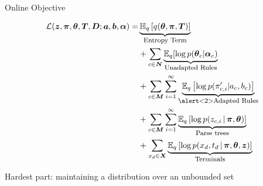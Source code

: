 \begin{frame}{Online Objective}

\begin{align}
\elbo ( \boldsymbol{z}, \boldsymbol{\pi}, \boldsymbol{\theta},
  \boldsymbol{T}, \boldsymbol{D}; \boldsymbol{a}, \boldsymbol{b},
  \boldsymbol{\alpha}) = & \explain{Entropy Term}{\h{q}{ q( \boldsymbol{\theta}, \boldsymbol{\pi}, \boldsymbol{T} ) }} \notag \\
  & +  \sum_{c \in \boldsymbol{N}} \explain{Unadapted Rules}{\mathbb{E}_q [ \log{ p(
    \boldsymbol{\theta}_c | \boldsymbol{\alpha}_c ) } } \notag \\
  &  + \sum_{c \in \boldsymbol{M}} \sum_{i=1}^{\infty}
  \explain{\alert<2>{Adapted Rules}}{\e{q}{ \log{   p ( \pi^{\prime}_{c, i} | a_c, b_c
    ) } }} \notag \\
  &  + \sum_{c \in \boldsymbol{M}} \sum_{i=1}^{\infty}
  \explain{Parse trees}{\e{q}{ \log{ p ( z_{c, i} \g \boldsymbol{\pi},
    \boldsymbol{\theta} ) } } } \notag \\
  &  + \sum_{x_d \in \boldsymbol{X}} \explain{Terminals} {\e{q}{\log{ p (
    x_d, t_d \g \boldsymbol{\pi}, \boldsymbol{\theta}, \boldsymbol{z}) }
  }} \notag
\end{align}

Hardest part: maintaining a distribution over an unbounded set

\end{frame}

